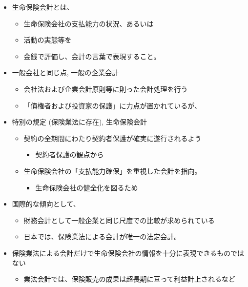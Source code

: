 \documentclass[report,gutter=10mm,fore-edge=10mm,uplatex,dvipdfmx]{jlreq}
\begin{document}
\begin{itemize}
\tightlist
\item
  生命保険会計とは、

  \begin{itemize}
  \tightlist
  \item
    生命保険会社の支払能力の状況、あるいは
  \item
    活動の実態等を
  \item
    金銭で評価し、会計の言葉で表現すること。
  \end{itemize}
\item
  一般会社と同じ点, 一般の企業会計

  \begin{itemize}
  \tightlist
  \item
    会社法および企業会計原則等に則った会計処理を行う
  \item
    「債権者および投資家の保護」に力点が置かれているが、
  \end{itemize}
\item
  特別の規定 (保険業法に存在), 生命保険会計

  \begin{itemize}
  \tightlist
  \item
    契約の全期間にわたり契約者保護が確実に遂行されるよう

    \begin{itemize}
    \tightlist
    \item
      契約者保護の観点から
    \end{itemize}
  \item
    生命保険会社の「支払能力確保」を重視した会計を指向。

    \begin{itemize}
    \tightlist
    \item
      生命保険会社の健全化を図るため
    \end{itemize}
  \end{itemize}
\item
  国際的な傾向として、

  \begin{itemize}
  \tightlist
  \item
    財務会計として一般企業と同じ尺度での比較が求められている
  \item
    日本では、保険業法による会計が唯一の法定会計。
  \end{itemize}
\item
  保険業法による会計だけで生命保険会社の情報を十分に表現できるものではない

  \begin{itemize}
  \tightlist
  \item
    業法会計では、保険販売の成果は超長期に亘って利益計上されるなど
  \end{itemize}
\end{itemize}
\end{document}
